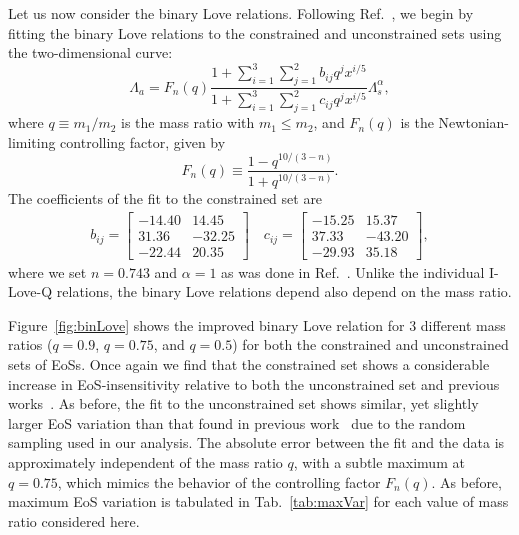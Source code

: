 \documentclass[prd,twocolumn,nofootinbib,superscriptaddress,amsmath,amssymb]{revtex4-1}
\begin{document}
Let us now consider the binary Love relations. Following Ref.~\cite{Yagi:binLove}, we begin by fitting the binary Love relations to the constrained and unconstrained sets using the two-dimensional curve:
\begin{equation}\label{eq:binLovefit}
\Lambda_a=F_n(q) \frac{1+ \sum_{i=1}^3 \sum_{j=1}^2 b_{ij}q^j x^{i/5}}{1 + \sum_{i=1}^3 \sum_{j=1}^2 c_{ij}q^j x^{i/5}} \Lambda_s^{\alpha},
\end{equation}
where $q\equiv m_{1}/m_{2}$ is the mass ratio with $m_1 \leq m_2$, and $F_n(q)$ is the Newtonian-limiting controlling factor, given by
\begin{equation}\label{eq:control}
F_n(q) \equiv \frac{1-q^{10/(3-n)}}{1+q^{10/(3-n)}}.
\end{equation}
The coefficients of the fit to the constrained set are 
\begin{align}
b_{ij} = \begin{bmatrix}
    -14.40 & 14.45   \\
    31.36 & -32.25   \\
    -22.44 & 20.35   
\end{bmatrix}
\quad
c_{ij} = \begin{bmatrix}
    -15.25 & 15.37   \\
    37.33 & -43.20   \\
    -29.93 & 35.18   
\end{bmatrix},
\end{align}
where we set $n = 0.743$ and $\alpha = 1$ as was done in Ref.~\cite{Yagi:binLove}.
Unlike the individual I-Love-Q relations, the binary Love relations depend also depend on the mass ratio. 

Figure~\ref{fig:binLove} shows the improved binary Love relation for 3 different mass ratios ($q=0.9$, $q=0.75$, and $q=0.5$) for both the constrained and unconstrained sets of EoSs. Once again we find that the constrained set shows a considerable increase in EoS-insensitivity relative to both the unconstrained set and previous works~\cite{Yagi:binLove}. As before, the fit to the unconstrained set shows similar, yet slightly larger EoS variation than that found in previous work~\cite{Yagi:binLove} due to the random sampling used in our analysis. The absolute error between the fit and the data is approximately independent of the mass ratio $q$, with a subtle maximum at $q=0.75$, which mimics the behavior of the controlling factor $F_n(q)$. As before, maximum EoS variation is tabulated in Tab.~\ref{tab:maxVar} for each value of mass ratio considered here.
\end{document}
